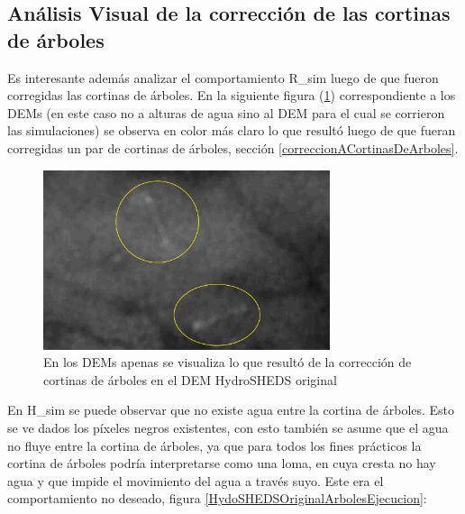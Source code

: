 \documentclass[10pt,a4paper, twoside]{report}
\begin{document}
\subsection{Análisis Visual de la corrección de las cortinas de árboles}

Es interesante además analizar el comportamiento R\_sim luego de que fueron corregidas las cortinas de árboles. En la siguiente figura (\ref{HydoSHEDSOriginalArboles}) correspondiente a los DEMs (en este caso no a alturas de agua sino al DEM para el cual se corrieron las simulaciones) se observa en color más claro lo que resultó luego de que fueran corregidas un par de cortinas de árboles, sección \ref{correccionACortinasDeArboles}. 

\begin{figure}[H]
   \centering      
   \includegraphics[width=0.75\textwidth]{imagenes/HydoSHEDSOriginalArboles.jpg}
 \caption{En los DEMs apenas se visualiza lo que resultó de la corrección de cortinas de árboles en el DEM HydroSHEDS original}
 \label{HydoSHEDSOriginalArboles}
\end{figure}


En H\_sim se puede observar que no existe agua entre la cortina de árboles. Esto se ve dados los píxeles negros existentes, con esto también se asume que el agua no fluye entre la cortina de árboles, ya que para todos los fines prácticos la cortina de árboles podría interpretarse como una loma, en cuya cresta no hay agua y que impide el movimiento del agua a través suyo. Este era el comportamiento no deseado, figura \ref{HydoSHEDSOriginalArbolesEjecucion}:
\end{document}
